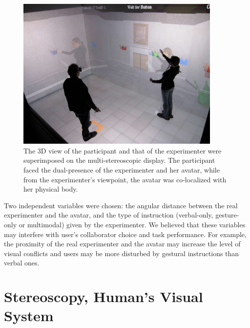 \begin{figure}[ht]
  \centering
  \includegraphics[width=0.9\textwidth]{figures/2_demo}
  \caption{\label{fig:2_demo}The 3D view of the participant and that of the experimenter were superimposed on the multi-stereoscopic display. The participant faced the dual-presence of the experimenter and her avatar, while from the experimenter's viewpoint, the avatar was co-localized with her physical body.}
\end{figure}

Two independent variables were chosen: the angular distance between the real experimenter and the avatar, and the type of instruction (verbal-only, gesture-only or multimodal) given by the experimenter. We believed that these variables may interfere with user's collaborator choice and task performance. For example, the proximity of the real experimenter and the avatar may increase the level of visual conflicts and users may be more disturbed by gestural instructions than verbal ones.


\section{Stereoscopy, Human's Visual System}


